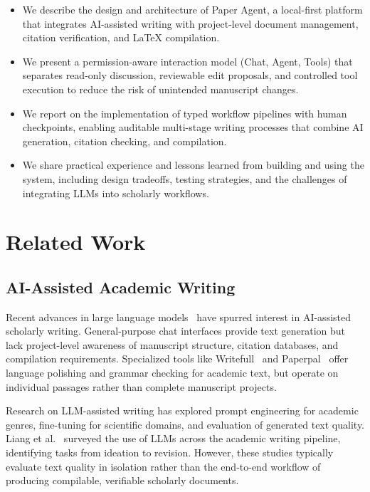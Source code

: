 \documentclass[11pt,a4paper]{article}
\newcommand{\software}{Paper Agent}
\begin{document}
\begin{itemize}
  \item We describe the design and architecture of \software{}, a local-first
  platform that integrates AI-assisted writing with project-level document
  management, citation verification, and \LaTeX{} compilation.

  \item We present a permission-aware interaction model (Chat, Agent, Tools)
  that separates read-only discussion, reviewable edit proposals, and
  controlled tool execution to reduce the risk of unintended manuscript
  changes.

  \item We report on the implementation of typed workflow pipelines with human
  checkpoints, enabling auditable multi-stage writing processes that combine AI
  generation, citation checking, and compilation.

  \item We share practical experience and lessons learned from building and
  using the system, including design tradeoffs, testing strategies, and the
  challenges of integrating LLMs into scholarly workflows.
\end{itemize}

\section{Related Work}

\subsection{AI-Assisted Academic Writing}

Recent advances in large language models~\cite{openai2023gpt4,anthropic2024claude}
have spurred interest in AI-assisted scholarly writing. General-purpose chat
interfaces provide text generation but lack project-level awareness of
manuscript structure, citation databases, and compilation requirements.
Specialized tools like Writefull~\cite{writefull} and Paperpal~\cite{paperpal}
offer language polishing and grammar checking for academic text, but operate on
individual passages rather than complete manuscript projects.

Research on LLM-assisted writing has explored prompt engineering for academic
genres, fine-tuning for scientific domains, and evaluation of generated text
quality. Liang et al.~\cite{liang2024llmwriting} surveyed the use of LLMs
across the academic writing pipeline, identifying tasks from ideation to
revision. However, these studies typically evaluate text quality in isolation
rather than the end-to-end workflow of producing compilable, verifiable
scholarly documents.
\end{document}
